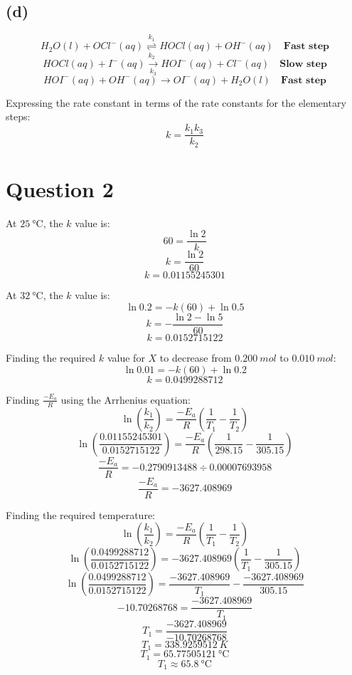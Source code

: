 \documentclass[11pt]{article}
\begin{document}
\subsection{(d)}
\label{sec:org79ca391}

\[H_2O (l) + OCl^- (aq) \underset{k_2}{\stackrel{k_1}{\rightleftharpoons}} HOCl (aq) + OH^- (aq) \quad \textbf{Fast step}\]
\[HOCl (aq) + I^- (aq) \underset{k_3}{\rightarrow} HOI^- (aq) + Cl^- (aq) \quad \textbf{Slow step}\]
\[HOI^- (aq) + OH^- (aq) \rightarrow OI^- (aq) + H_2O (l) \quad \textbf{Fast step}\]

Expressing the rate constant in terms of the rate constants for the elementary steps:
\[k = \frac{k_1 k_3}{k_2}\]


\section{Question 2}
\label{sec:orgd3b9963}

At \(\qty{25}{\unit{\degreeCelsius}}\), the \(k\) value is:
\[60 = \frac{\ln 2}{k}\]
\[k = \frac{\ln 2}{60}\]
\[k = 0.01155245301\]

At \(\qty{32}{\unit{\degreeCelsius}}\), the \(k\) value is:
\[\ln 0.2 = -k(60) + \ln 0.5\]
\[k = -\frac{\ln 2 - \ln 5}{60}\]
\[k = 0.0152715122\]

Finding the required \(k\) value for \(X\) to decrease from \(\qty{0.200}{\unit{mol}}\) to \(\qty{0.010}{\unit{mol}}\):
\[\ln 0.01 = -k(60) + \ln 0.2\]
\[k = 0.0499288712\]

Finding \(\frac{-E_a}{R}\) using the Arrhenius equation:
\[\ln \left( \frac{k_1}{k_2} \right) = \frac{-E_a}{R} \left(\frac{1}{T_1} - \frac{1}{T_2} \right)\]
\[\ln \left( \frac{0.01155245301}{0.0152715122} \right) = \frac{-E_a}{R} \left(\frac{1}{298.15} - \frac{1}{305.15} \right)\]
\[\frac{-E_a}{R} = -0.2790913488 \div 0.00007693958\]
\[\frac{-E_a}{R} = -3627.408969\]

\newpage

Finding the required temperature:
\[\ln \left( \frac{k_1}{k_2} \right) = \frac{-E_a}{R} \left(\frac{1}{T_1} - \frac{1}{T_2} \right)\]
\[\ln \left( \frac{0.0499288712}{0.0152715122} \right) = -3627.408969 \left(\frac{1}{T_1} - \frac{1}{305.15} \right)\]
\[\ln \left( \frac{0.0499288712}{0.0152715122} \right) = \frac{-3627.408969}{T_1} - \frac{-3627.408969}{305.15}\]
\[-10.70268768 = \frac{-3627.408969}{T_1}\]
\[T_1 = \frac{-3627.408969}{-10.70268768}\]
\[T_1 = \qty{338.9259512}{\unit{K}}\]
\[T_1 = \qty{65.77505121}{\unit{\degreeCelsius}}\]
\[T_1 \approx \qty{65.8}{\unit{\degreeCelsius}}\]
\end{document}
